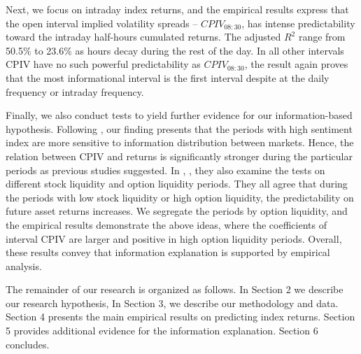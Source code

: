 Next, we focus on intraday index returns, and the empirical results express that the open interval implied volatility spreads -- $CPIV_{08:30}$, has intense predictability toward the intraday half-hours cumulated returns. The adjusted $R^{2}$ range from 50.5\% to 23.6\% as hours decay during the rest of the day. In all other intervals CPIV have no such powerful predictability as $CPIV_{08:30}$, the result again proves that the most informational interval is the first interval despite at the daily frequency or intraday frequency.     

Finally, we also conduct tests to yield further evidence for our information-based hypothesis. Following \textcite{atilgan2015implied}, our finding presents that the periods with high sentiment index are more sensitive to information distribution between markets. Hence, the relation between CPIV and returns is significantly stronger during the particular periods as previous studies suggested. In \textcite{pan2006information}, \textcite{chang2018implied}, they also examine the tests on different stock liquidity and option liquidity periods. They all agree that during the periods with low stock liquidity or high option liquidity, the predictability on future asset returns increases. We segregate the periods by option liquidity, and the empirical results demonstrate the above ideas, where the coefficients of interval CPIV are larger and positive in high option liquidity periods. Overall, these results convey that information explanation is supported by empirical analysis. 

The remainder of our research is organized as follows. In Section 2 we describe our research hypothesis, In Section 3, we describe our methodology and data. Section 4 presents the main empirical results on predicting index returns. Section 5 provides additional evidence for the information explanation. Section 6 concludes. 